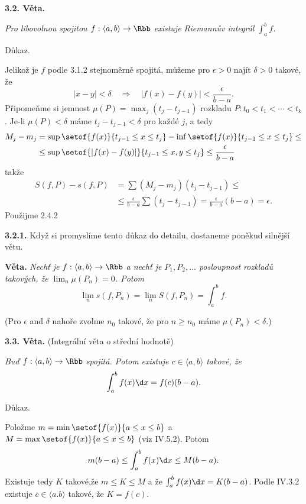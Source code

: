 \documentclass[12pt]{article}
\begin{document}
{\bigskip

{\bf 3.2. Věta.} {\em Pro libovolnou spojitou  $f:\langle a,b \rangle \to\Rbb$ existuje  Riemannův integrál
$\int_a^bf$.

Důkaz.} Jelikož je $f$ podle 3.1.2 stejnoměrně spojitá, můžeme pro $\epsilon>0$ najít $\delta>0$ takové, že
$$
|x-y|< \delta \quad\Rightarrow\quad |f(x)-f(y)|< \frac{\epsilon}{b-a}.
$$
Připomeňme si jemnost $\mu(P)=\max_j(t_j-t_{j-1})$ rozkladu $P: t_0<t_1<\cdots<t_k$. Je-li $\mu(P)<\delta$ máme $t_j-t_{j-1}<\delta$ pro každé $j$,
a tedy
$$
\begin{aligned}
M_j-m_j&= \sup\setof{f(x)}{t_{j-1}\leq x\leq t_j}-\inf\setof{f(x)}{t_{j-1}\leq x\leq t_j}\leq \\
 &\leq\sup\setof{|f(x)-f(y)|}{t_{j-1}\leq x,y\leq t_j}\leq\frac{\epsilon}{b-a}
 \end{aligned}
 $$
 takže
 $$
 \begin{aligned}
 S(f,P)-s(f,P)&=\sum(M_j-m_j)(t_j-t_{j-1})\leq\\
 &\leq\frac{\epsilon}{b-a}\sum(t_j-t_{j-1})=\frac{\epsilon}{b-a}(b-a)=\epsilon.
 \end{aligned}
 $$
 Použijme 2.4.2 \sq
 
 \medskip
 
 {\bf 3.2.1.} Když si promyslíme tento důkaz do detailu, dostaneme poněkud silnější větu.
 
 \smallskip
 
 {\bf Věta.} {\em  Nechť je $f:\langle a,b \rangle \to\Rbb$ a nechť je $P_1,P_2,\dots$ posloupnost rozkladů takových, že
 $\lim_n\mu(P_n)=0$. Potom
 $$
 \lim_n s(f,P_n)=\lim_n S(f,P_n)=\int_a^b f.
 $$}
 
 (Pro $\epsilon$ and $\delta$ nahoře zvolme $n_0$ takové, že pro $n\geq n_0$ máme $\mu(P_n)<\delta$.)
 
 \bigskip


{\bf 3.3. Věta.} (Integrální věta o střední hodnotě) {\em Buď $f:\langle a,b\rangle\to\Rbb$ spojitá.
Potom existuje $c\in\langle a,b\rangle$ takové, že
$$
\int_a^bf(x)\d x= f(c)(b-a).
$$

Důkaz.} Položme $m=\min\setof{f(x)}{a\leq x\leq b}$ a
  $M=\max\setof{f(x)}{a\leq x\leq b}$ (viz IV.5.2). Potom
  $$
  m(b-a)\leq \int_a^bf(x)\d x\leq M(b-a).
  $$
  Existuje tedy $K$ takové,že $m\leq K\leq M$ a že $\int_a^bf(x)\d x=K(b-a)$.
  Podle IV.3.2 existuje $c\in\langle a.b\rangle$ takové, že $K=f(c)$. \sq
 


 \vskip10mm
 
}
\end{document}
